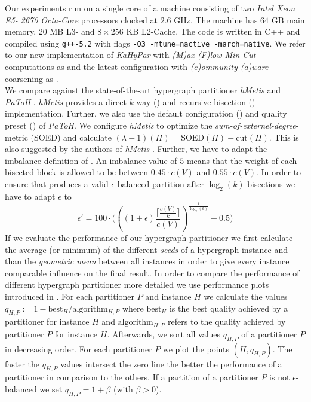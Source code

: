 Our experiments run on a single core of a machine consisting of two \emph{Intel Xeon E5-
2670 Octa-Core} processors clocked at $2.6$ GHz. The machine has $64$ GB main memory,
$20$ MB L$3$- and $8\times256$ KB L$2$-Cache. The code is written in C++ and compiled using
\lstinline{g++-5.2} with flags \lstinline{-O3 -mtune=nactive -march=native}. We refer to
our new implementation of \emph{KaHyPar} with \emph{(M)ax-(F)low-Min-Cut} computations 
as  and the latest configuration with \emph{(c)ommunity-(a)ware} coarsening as
. \\
We compare  against the state-of-the-art hypergraph partitioner \emph{hMetis} 
\cite{karypis1999multilevel,karypis2000multilevel} and \emph{PaToH} \cite{catalyurek1999hypergraph}.
\emph{hMetis} provides a direct $k$-way () and recursive bisection () implementation.
Further, we also use the default configuration () and quality preset () of
\emph{PaToH}. We configure \emph{hMetis} to optimize the \emph{sum-of-externel-degree}-metric
(SOED) and calculate $(\lambda-1)(\Pi) = \text{SOED}(\Pi) - \text{cut}(\Pi)$. This is also
suggested by the authors of \emph{hMetis} \cite{karypis2000multilevel}. Further, we have
to adapt the imbalance definition of . An imbalance value of $5$ means that the weight
of each bisected block is allowed to be between $0.45 \cdot c(V)$ and $0.55 \cdot c(V)$. In order
to ensure that  produces a valid $\epsilon$-balanced partition after $\log_2(k)$
bisections we have to adapt $\epsilon$ to
\[\epsilon' = 100 \cdot \Bigg( \left( (1 + \epsilon) \frac{\lceil \frac{c(V)}{k} \rceil}{c(V)} \right)^{\frac{1}{\log_2(k)}} - 0.5 \Bigg)\]
If we evaluate the performance of our hypergraph partitioner 
we first calculate the average (or minimum) of the different \emph{seeds} of a hypergraph
instance and than the \emph{geometric mean} between all instances in order to give every instance
comparable influence on the final result. In order to compare the performance of different 
hypergraph partitioner more detailed we use performance plots introduced in \cite{schlag2016k}.
For each partitioner $P$ and instance $H$ we calculate the values $q_{H,P} := 1 - \text{best$_H$}/\text{algorithm$_{H,P}$}$ 
where $\text{best$_{H}$}$ is the best quality achieved by a partitioner for instance $H$ and
$\text{algorithm$_{H,P}$}$ refers to the quality achieved by partitioner $P$ for instance
$H$. Afterwards, we sort all values $q_{H,P}$ of a partitioner $P$ in decreasing order. For each
partitioner $P$ we plot the points $(H,q_{H,P})$. The faster the $q_{H,P}$ values intersect
the zero line the better the performance of a partitioner in comparison to the others. If a partition
of a partitioner $P$ is not $\epsilon$-balanced we set $q_{H,P} = 1 + \beta$ (with $\beta > 0$).

